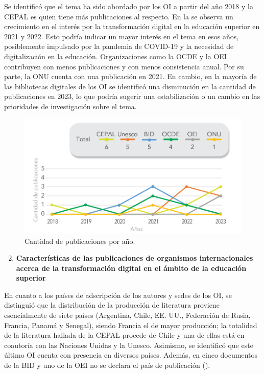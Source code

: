 Se identificó que el tema ha sido abordado por los OI a partir del año
2018 y la CEPAL es quien tiene más publicaciones al respecto. En la
 se observa un crecimiento en el interés por la transformación
digital en la educación superior en 2021 y 2022. Esto podría indicar un
mayor interés en el tema en esos años, posiblemente impulsado por la
pandemia de COVID-19 y la necesidad de digitalización en la educación.
Organizaciones como la OCDE y la OEI contribuyen con menos publicaciones
y con menos consistencia anual. Por su parte, la ONU cuenta con una
publicación en 2021. En cambio, en la mayoría de las bibliotecas
digitales de los OI se identificó una disminución en la cantidad de
publicaciones en 2023, lo que podría sugerir una estabilización o un
cambio en las prioridades de investigación sobre el tema.

\begin{figure}[htpb]
  \centering
  \begin{minipage}{.8\textwidth}
  \includegraphics[width=\textwidth]{figure-02.png}
  \caption{Cantidad de publicaciones por año.}
  \label{fig-02}
  \end{minipage}
\end{figure}

\begin{enumerate}[label=\textbf{PI\arabic*}]
\setcounter{enumi}{1}
\item
  \textbf{Características de las publicaciones de organismos
  internacionales acerca de la transformación digital en el ámbito de la
  educación superior}
\end{enumerate}

En cuanto a los países de adscripción de los autores y sedes de los OI,
se distinguió que la distribución de la producción de literatura
proviene esencialmente de siete países (Argentina, Chile, EE. UU.,
Federación de Rusia, Francia, Panamá y Senegal), siendo Francia el de
mayor producción; la totalidad de la literatura hallada de la CEPAL
procede de Chile y una de ellas está en coautoría con las Naciones
Unidas y la Unesco. Asimismo, se identificó que este último OI cuenta
con presencia en diversos países. Además, en cinco documentos de la BID
y uno de la OEI no se declara el país de publicación ().

